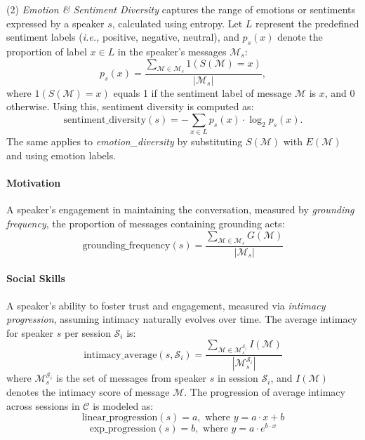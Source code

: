 \vspace{0.2cm}\noindent
(2) \textit{Emotion \& Sentiment Diversity} captures the range of emotions or sentiments expressed by a speaker \(s\), calculated using entropy.
Let \(L\) represent the predefined sentiment labels (\textit{i.e.,} positive, negative, neutral), and \(p_s(x)\) denote the proportion of label \(x \in L\) in the speaker's messages \(\mathcal{M}_s\):
\[
p_s(x) = \frac{\sum_{\mathcal{M} \in \mathcal{M}_s} 1 (S(\mathcal{M}) = x)}{|\mathcal{M}_s|},
\]
where \(1 (S(\mathcal{M}) = x)\) equals 1 if the sentiment label of message \(\mathcal{M}\) is \(x\), and 0 otherwise.  
Using this, sentiment diversity is computed as:
\[
\text{sentiment\_diversity}(s) = - \sum_{x \in L} p_s(x) \cdot \log_2 p_s(x).
\]
The same applies to \textit{emotion\_diversity} by substituting \(S(\mathcal{M})\) with \(E(\mathcal{M})\) and using emotion labels.


\paragraph{Motivation}
A speaker’s engagement in maintaining the conversation, measured by \textit{grounding frequency}, the proportion of messages containing grounding acts:  
\[
\text{grounding\_frequency}(s) = \frac{\sum_{\mathcal{M} \in \mathcal{M}_s} G(\mathcal{M})}{|\mathcal{M}_s|}
\]


\paragraph{Social Skills}
A speaker’s ability to foster trust and engagement, measured via \textit{intimacy progression}, assuming intimacy naturally evolves over time.
The average intimacy for speaker $s$ per session $\mathcal{S}_i$ is:
\[
\text{intimacy\_average}(s, \mathcal{S}_i) = \frac{\sum_{\mathcal{M} \in \mathcal{M}_s^{\mathcal{S}_i}} I(\mathcal{M})}{|\mathcal{M}_s^{\mathcal{S}_i}|}
\] 
where \( \mathcal{M}_s^{\mathcal{S}_i} \) is the set of messages from speaker \( s \) in session \( \mathcal{S}_i \), and \( I(\mathcal{M}) \) denotes the intimacy score of message \( \mathcal{M} \).
The progression of average intimacy across sessions in \(\mathcal{C}\) is modeled as:  
\[
\text{linear\_progression}(s) = a, \text{ where } y = a \cdot x + b
\]  
\[
\text{exp\_progression}(s) = b, \text{ where } y = a \cdot e^{b \cdot x}
\]


